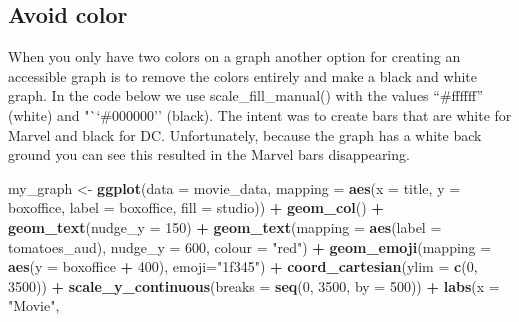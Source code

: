 \documentclass[
]{krantz}
\makeatletter
\newenvironment{Shaded}{\begin{snugshade}}{\end{snugshade}}
\newcommand{\DataTypeTok}[1]{\textcolor[rgb]{0.27,0.27,0.27}{#1}}
\newcommand{\DecValTok}[1]{\textcolor[rgb]{0.06,0.06,0.06}{#1}}
\newcommand{\KeywordTok}[1]{\textcolor[rgb]{0.27,0.27,0.27}{\textbf{#1}}}
\newcommand{\NormalTok}[1]{#1}
\newcommand{\OperatorTok}[1]{\textcolor[rgb]{0.43,0.43,0.43}{\textbf{#1}}}
\newcommand{\StringTok}[1]{\textcolor[rgb]{0.5,0.5,0.5}{#1}}
\newenvironment{kframe}{%
\medskip{}
\setlength{\fboxsep}{.8em}
 \def\at@end@of@kframe{}%
 \ifinner\ifhmode%
  \def\at@end@of@kframe{\end{minipage}}%
  \begin{minipage}{\columnwidth}%
 \fi\fi%
 \def\FrameCommand##1{\hskip\@totalleftmargin \hskip-\fboxsep
 \colorbox{shadecolor}{##1}\hskip-\fboxsep
     \hskip-\linewidth \hskip-\@totalleftmargin \hskip\columnwidth}%
 \MakeFramed {\advance\hsize-\width
   \@totalleftmargin\z@ \linewidth\hsize
   \@setminipage}}%
 {\par\unskip\endMakeFramed%
 \at@end@of@kframe}
\renewenvironment{Shaded}{\begin{kframe}}{\end{kframe}}
\makeatother
\begin{document}
\newpage

\hypertarget{avoid-color}{%
\subsection{Avoid color}\label{avoid-color}}

When you only have two colors on a graph another option for creating an accessible graph is to remove the colors entirely and make a black and white graph. In the code below we use scale\_fill\_manual() with the values ``\#ffffff'' (white) and "``\#000000'' (black). The intent was to create bars that are white for Marvel and black for DC. Unfortunately, because the graph has a white back ground you can see this resulted in the Marvel bars disappearing.

\begin{Shaded}
\begin{Highlighting}[]
\NormalTok{my_graph <-}\StringTok{ }\KeywordTok{ggplot}\NormalTok{(}\DataTypeTok{data =}\NormalTok{ movie_data,}
           \DataTypeTok{mapping =} \KeywordTok{aes}\NormalTok{(}\DataTypeTok{x =}\NormalTok{ title,}
                         \DataTypeTok{y =}\NormalTok{ boxoffice,}
                         \DataTypeTok{label =}\NormalTok{ boxoffice, }
                         \DataTypeTok{fill =}\NormalTok{ studio)) }\OperatorTok{+}
\StringTok{  }\KeywordTok{geom_col}\NormalTok{() }\OperatorTok{+}
\StringTok{  }\KeywordTok{geom_text}\NormalTok{(}\DataTypeTok{nudge_y =} \DecValTok{150}\NormalTok{)  }\OperatorTok{+}
\StringTok{  }\KeywordTok{geom_text}\NormalTok{(}\DataTypeTok{mapping =} \KeywordTok{aes}\NormalTok{(}\DataTypeTok{label =}\NormalTok{ tomatoes_aud), }
            \DataTypeTok{nudge_y =} \DecValTok{600}\NormalTok{, }
            \DataTypeTok{colour =} \StringTok{"red"}\NormalTok{) }\OperatorTok{+}
\StringTok{  }\KeywordTok{geom_emoji}\NormalTok{(}\DataTypeTok{mapping =} \KeywordTok{aes}\NormalTok{(}\DataTypeTok{y =}\NormalTok{ boxoffice }\OperatorTok{+}\StringTok{ }\DecValTok{400}\NormalTok{),}
             \DataTypeTok{emoji=}\StringTok{"1f345"}\NormalTok{) }\OperatorTok{+}
\StringTok{  }\KeywordTok{coord_cartesian}\NormalTok{(}\DataTypeTok{ylim =} \KeywordTok{c}\NormalTok{(}\DecValTok{0}\NormalTok{, }\DecValTok{3500}\NormalTok{)) }\OperatorTok{+}
\StringTok{  }\KeywordTok{scale_y_continuous}\NormalTok{(}\DataTypeTok{breaks =} \KeywordTok{seq}\NormalTok{(}\DecValTok{0}\NormalTok{, }\DecValTok{3500}\NormalTok{, }\DataTypeTok{by =} \DecValTok{500}\NormalTok{)) }\OperatorTok{+}
\StringTok{  }\KeywordTok{labs}\NormalTok{(}\DataTypeTok{x =} \StringTok{"Movie"}\NormalTok{,}

\end{Highlighting}
\end{Shaded}
\end{document}
